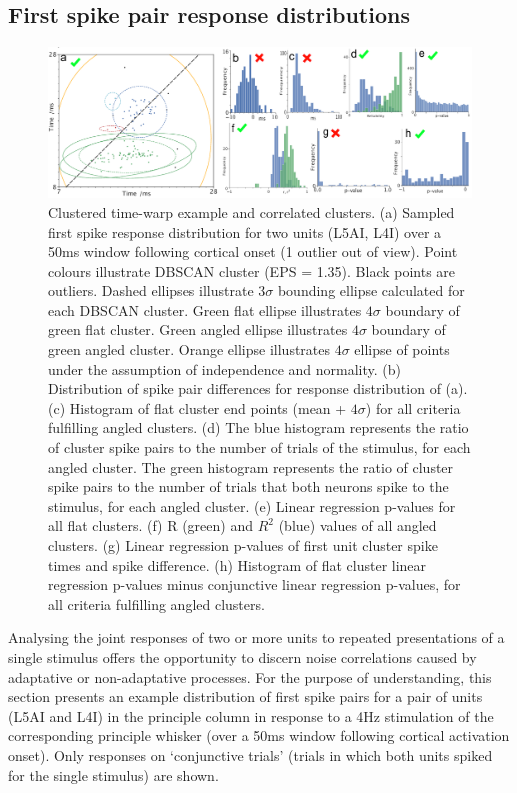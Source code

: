 \documentclass{article}
\begin{document}
\subsection*{First spike pair response distributions}

\begin{figure}[t!]
\centering
\includegraphics[width=\textwidth]{Figure3.pdf}
\caption{Clustered time-warp example and correlated clusters. (a) Sampled first spike response distribution for two units (L5AI, L4I) over a 50ms window following cortical onset (1 outlier out of view). Point colours illustrate DBSCAN cluster (EPS = 1.35). Black points are outliers. Dashed ellipses illustrate $3\sigma$ bounding ellipse calculated for each DBSCAN cluster. Green flat ellipse illustrates $4\sigma$ boundary of green flat cluster. Green angled ellipse illustrates $4\sigma$ boundary of green angled cluster. Orange ellipse illustrates $4\sigma$ ellipse of points under the assumption of independence and normality. (b) Distribution of spike pair differences for response distribution of (a). (c) Histogram of flat cluster end points (mean + $4\sigma$) for all criteria fulfilling angled clusters. (d) The blue histogram represents the ratio of cluster spike pairs to the number of trials of the stimulus, for each angled cluster. The green histogram represents the ratio of cluster spike pairs to the number of trials that both neurons spike to the stimulus, for each angled cluster. (e) Linear regression p-values for all flat clusters. (f) R (green) and $R^2$ (blue) values of all angled clusters. (g) Linear regression p-values of first unit cluster spike times and spike difference. (h) Histogram of flat cluster linear regression p-values minus conjunctive linear regression p-values, for all criteria fulfilling angled clusters.}
\label{fig:fig3}
\end{figure}


Analysing the joint responses of two or more units to repeated presentations of a single stimulus offers the opportunity to discern noise correlations caused by adaptative or non-adaptative processes. For the purpose of understanding, this section presents an example distribution of first spike pairs for a pair of units (L5AI and L4I) in the principle column in response to a 4Hz stimulation of the corresponding principle whisker (over a 50ms window following cortical activation onset). Only responses on `conjunctive trials' (trials in which both units spiked for the single stimulus) are shown. 
\end{document}
